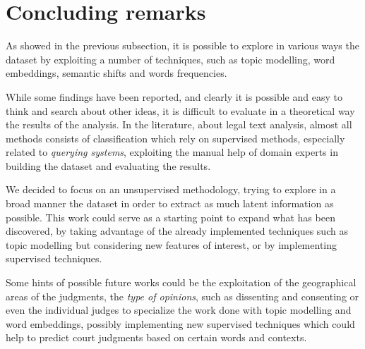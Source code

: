 \section{Concluding remarks}
As showed in the previous subsection, it is possible to explore
in various ways the dataset by exploiting a number of techniques, such as topic modelling, word embeddings, semantic
shifts and words frequencies.

While some findings have been reported, and clearly it is possible and easy to think and search about other ideas, 
it is difficult to evaluate in a theoretical way the results of the analysis. In the literature, about 
legal text analysis, almost all methods consists of classification which rely on supervised methods, 
especially related to \emph{querying systems}, exploiting the manual help of domain experts in building the dataset 
and evaluating the results.~\cite{caselaw_query}

We decided to focus on an unsupervised methodology, trying to explore in a broad manner the dataset in order to
extract as much latent information as possible. This work could serve as a starting point to expand what has been
discovered, by taking advantage of the already implemented techniques such as topic modelling but considering new
features of interest, or by implementing supervised techniques.

Some hints of possible future works could be the exploitation of the geographical areas of the judgments, the \emph{type of
opinions}, such as dissenting and consenting or even the individual judges to specialize the work done with topic modelling
and word embeddings, possibly implementing new supervised techniques which could help to predict court judgments
based on certain words and contexts.~\cite{argumentation_mining}